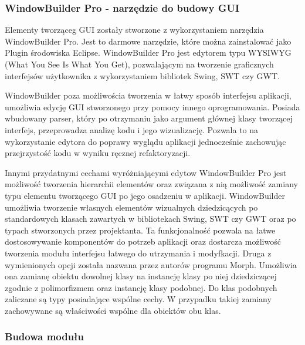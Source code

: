 \subsubsection{WindowBuilder Pro - narzędzie do budowy GUI}
Elementy tworząceg GUI zostały stworzone z wykorzystaniem narzędzia WindowBuilder Pro. Jest to darmowe narzędzie, które można zainstalować jako Plugin środowiska Eclipse. WindowBuilder Pro jest edytorem typu WYSIWYG (What You See Is What You Get), pozwalającym na tworzenie graficznych interfejsów użytkownika z wykorzystaniem bibliotek Swing, SWT czy GWT. 

WindowBuilder poza możliwościa tworzenia w łatwy sposób interfejsu aplikacji, umożliwia edycję GUI stworzonego przy pomocy innego oprogramowania. Posiada wbudowany parser, który po otrzymaniu jako argument głównej klasy tworzącej interfejs, przeprowadza analizę kodu i jego wizualizację. Pozwala to na wykorzystanie edytora do poprawy wyglądu aplikacji jednocześnie zachowując przejrzystość kodu w wyniku ręcznej refaktoryzacji.

Innymi przydatnymi cechami wyróżniającymi edytow WindowBuilder Pro jest możliwość tworzenia hierarchii elementów oraz związana z nią
możliwość zamiany typu elementu tworzącego GUI po jego osadzeniu w aplikacji. WindowBuilder umożliwia tworzenie własnych elementów wizualnych dziedzicących po standardowych klasach zawartych w bibliotekach Swing, SWT czy GWT oraz po typach stworzonych przez projektanta. Ta funkcjonalność pozwala na łatwe dostosowywanie komponentów do potrzeb aplikacji oraz dostarcza możliwość tworzenia modułu interfejsu łatwego do utrzymania i modyfkacji.
Druga z wymienionych opcji została nazwana przez autorów programu Morph. Umożliwia ona zamianę obiektu dowolnej klasy na instancję klasy po niej dziedziczącej zgodnie z polimorfizmem oraz instancję klasy podobnej. Do klas podobnych zaliczane są typy posiadające wspólne cechy. W przypadku takiej zamiany zachowywane są właściwości wspólne dla obiektów obu klas. 

\subsubsection{Budowa modułu}
